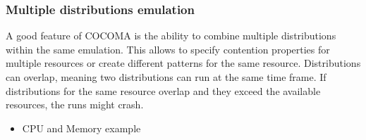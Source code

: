 \documentclass[letterpaper,10pt,english]{sphinxhowto}
\begin{document}
\subsubsection{Multiple distributions emulation}
\label{COCOMA/05_examples:multiple-distributions-emulation}
A good feature of COCOMA is the ability to combine multiple distributions within the same emulation. This allows to specify contention properties for multiple resources or create different patterns for the same resource. Distributions can overlap, meaning two distributions can run at the same time frame. If distributions for the same resource overlap and they exceed the available resources, the runs might crash.
\begin{itemize}
\item {} 
CPU and Memory example

\end{itemize}
\end{document}
